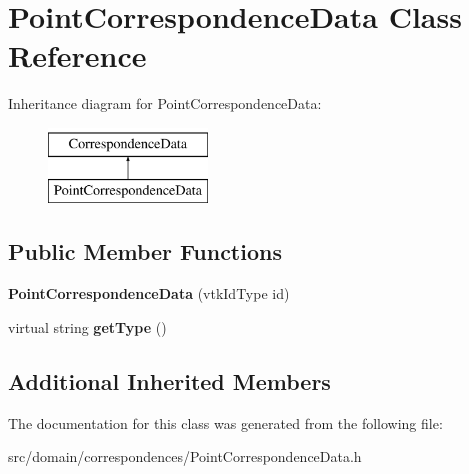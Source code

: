 \hypertarget{class_point_correspondence_data}{}\section{Point\+Correspondence\+Data Class Reference}
\label{class_point_correspondence_data}
Inheritance diagram for Point\+Correspondence\+Data\+:\begin{figure}[H]
\begin{center}
\leavevmode
\includegraphics[height=2.000000cm]{class_point_correspondence_data}
\end{center}
\end{figure}
\subsection*{Public Member Functions}
\begin{DoxyCompactItemize}
\item 
\hypertarget{class_point_correspondence_data_adc639a5dff9489880a880bb990befd0e}{}{\bfseries Point\+Correspondence\+Data} (vtk\+Id\+Type id)\label{class_point_correspondence_data_adc639a5dff9489880a880bb990befd0e}

\item 
\hypertarget{class_point_correspondence_data_afe00b9700744499a366075346025e41a}{}virtual string {\bfseries get\+Type} ()\label{class_point_correspondence_data_afe00b9700744499a366075346025e41a}

\end{DoxyCompactItemize}
\subsection*{Additional Inherited Members}


The documentation for this class was generated from the following file\+:\begin{DoxyCompactItemize}
\item 
src/domain/correspondences/Point\+Correspondence\+Data.\+h\end{DoxyCompactItemize}
